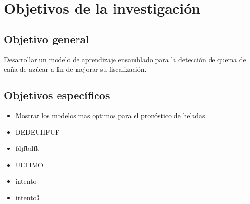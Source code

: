 \section{Objetivos de la investigación}
\subsection{Objetivo general}
Desarrollar un modelo de aprendizaje ensamblado para la detección de quema de caña de azúcar a fin de mejorar su fiscalización.
\subsection{Objetivos específicos}
\begin{itemize}    
    \item Mostrar los modelos mas optimos para el pronóstico de heladas.
    \item DEDEUHFUF
    \item fdjfbdfk
    \item ULTIMO
    \item intento
    \item intento3
\end{itemize}
